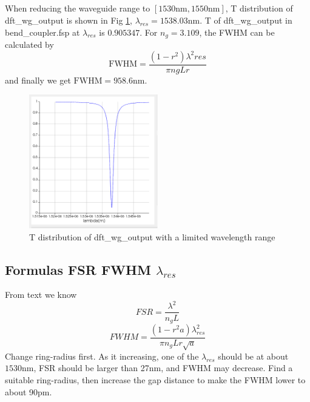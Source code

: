 \documentclass[fontsize=11pt]{scrartcl}
\begin{document}
\subsection{}
When reducing the waveguide range to $[1530\mathrm{nm},1550\mathrm{nm}]$, 
T distribution of dft\_wg\_output is shown in Fig \ref{fig3.2}, 
$\lambda_{res}=1538.03\mathrm{nm}$. 
T of dft\_wg\_output in bend\_coupler.fsp at $\lambda_{res}$ is $0.905347$. 
For $n_g=3.109$, the FWHM can be calculated by 
\begin{equation}
    \mathrm{FWHM}=\frac{\left(1-r^{2}\right) \lambda^{2} r e s}{\pi n g L r}
    \label{eq4}
\end{equation}
and finally we get $\mathrm{FWHM}=958.6\mathrm{nm}$.
\begin{figure}[H]
    \centering
     \includegraphics[width=0.5\textwidth]{img/fig3.2.png}
     \caption{T distribution of dft\_wg\_output with a limited wavelength range}
     \label{fig3.2}
\end{figure}  
\subsection{Formulas FSR FWHM $\lambda_{res}$}
From text we know
\begin{equation}
    F S R=\frac{\lambda^{2}}{n_{g} L}
\end{equation}
\begin{equation}
    F W H M=\frac{\left(1-r^{2} a\right) \lambda_{r e s}^{2}}{\pi n_{g} L r \sqrt{a}}
\end{equation}
Change ring-radius first. 
As it increasing, one of the $\lambda_{res}$ should be at about $1530\mathrm{nm}$, 
FSR should be larger than 27nm, and FWHM may decrease. 
Find a suitable ring-radius, then increase the gap distance to make the FWHM lower 
to about 90pm.
\end{document}
